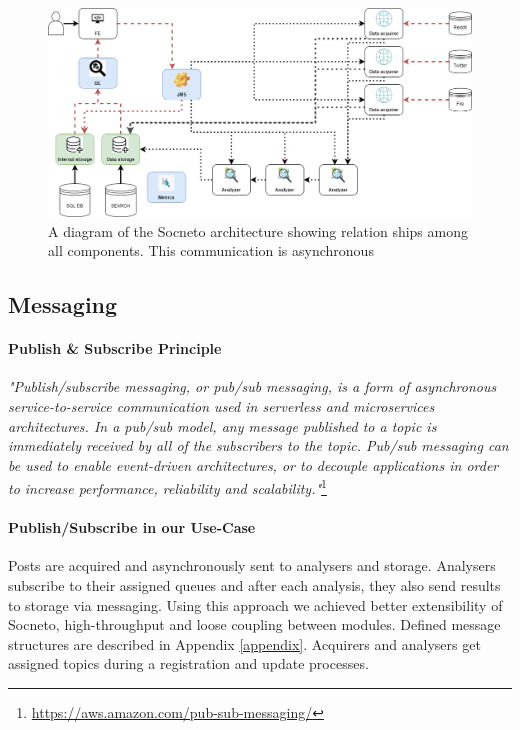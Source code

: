 \begin{figure}[ht]
    \centering
    \includegraphics[width=\textwidth]{diagrams/soc-all.png}
        \caption{A diagram of the Socneto architecture showing relation ships among all components. This communication is asynchronous}
        \label{fig:concept}
\end{figure}

\subsection{Messaging}\label{subsection:messaging}

\paragraph{Publish \& Subscribe Principle}

\textit{"Publish/subscribe messaging, or pub/sub messaging, is a form of asynchronous service-to-service communication used in serverless and microservices architectures. In a pub/sub model, any message published to a topic is immediately received by all of the subscribers to the topic. Pub/sub messaging can be used to enable event-driven architectures, or to decouple applications in order to increase performance, reliability and scalability."}\footnote{\url{https://aws.amazon.com/pub-sub-messaging/}}

\paragraph{Publish/Subscribe in our Use-Case}

Posts are acquired and asynchronously sent to analysers and storage. Analysers subscribe to their assigned queues and after each analysis, they also send results to storage via messaging. Using this approach we achieved better extensibility of Socneto, high-throughput and loose coupling between modules. Defined message structures are described in Appendix \ref{appendix}. Acquirers and analysers get assigned topics during a registration and update processes.

